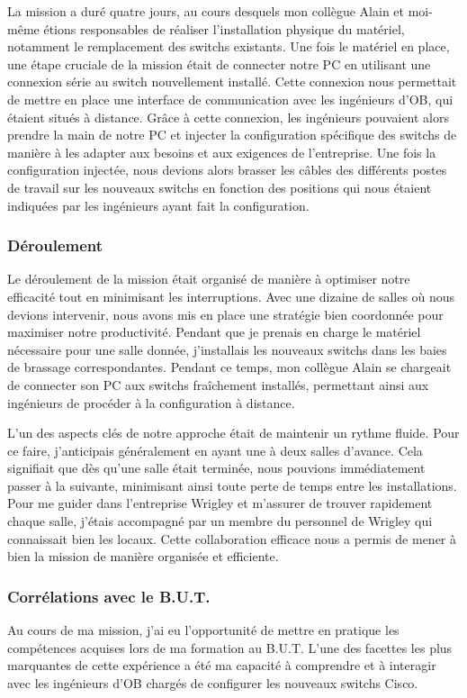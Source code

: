 \documentclass[12pt, a4paper]{article}
\begin{document}
La mission a duré quatre jours, au cours desquels 
mon collègue Alain et moi-même étions responsables 
de réaliser l'installation physique
du matériel, notamment le remplacement des switchs existants.
Une fois le matériel en place, une étape cruciale de la mission
était de connecter notre PC en utilisant une connexion série au
switch nouvellement installé. Cette connexion nous
permettait de mettre en place une interface de communication
avec les ingénieurs d'\gls{OB},
qui étaient situés à distance.
Grâce à cette connexion, les ingénieurs pouvaient alors prendre
la main de notre PC et injecter
la configuration spécifique des switchs de manière à les adapter
aux besoins et aux exigences de l'entreprise.
Une fois la configuration injectée, nous devions alors brasser 
les câbles des différents postes de travail sur les nouveaux switchs
en fonction des positions qui nous étaient indiquées par les
ingénieurs ayant fait la configuration.

\subsubsection{Déroulement}
Le déroulement de la mission était organisé de manière à optimiser
notre efficacité tout en minimisant les interruptions. Avec une
dizaine de salles où nous devions intervenir, nous avons mis en place une stratégie
bien coordonnée pour maximiser notre productivité. Pendant que je
prenais en charge le matériel nécessaire pour une salle donnée,
j'installais les nouveaux switchs dans les baies de brassage
correspondantes. Pendant ce temps, mon collègue Alain se chargeait
de connecter son PC aux switchs fraîchement installés, permettant
ainsi aux ingénieurs de procéder à la configuration à distance.

L'un des aspects clés de notre approche était de maintenir un
rythme fluide. Pour ce faire, j'anticipais généralement en ayant
une à deux salles d'avance. Cela signifiait
que dès qu'une salle était terminée, nous pouvions immédiatement
passer à la suivante, minimisant ainsi toute perte de temps entre
les installations. Pour me guider dans l'entreprise Wrigley et
m'assurer de trouver rapidement chaque salle, j'étais accompagné
par un membre du personnel de Wrigley qui connaissait bien les locaux.
Cette collaboration efficace nous a permis de mener à bien la mission
de manière organisée et efficiente.

\subsubsection{Corrélations avec le B.U.T.}
Au cours de ma mission, j'ai eu l'opportunité de mettre en
pratique les compétences acquises lors de ma formation au B.U.T.
L'une des facettes les plus marquantes de cette expérience a
été ma capacité à comprendre et à interagir avec les ingénieurs
d'\gls{OB} chargés de configurer les nouveaux switchs Cisco.
\end{document}
